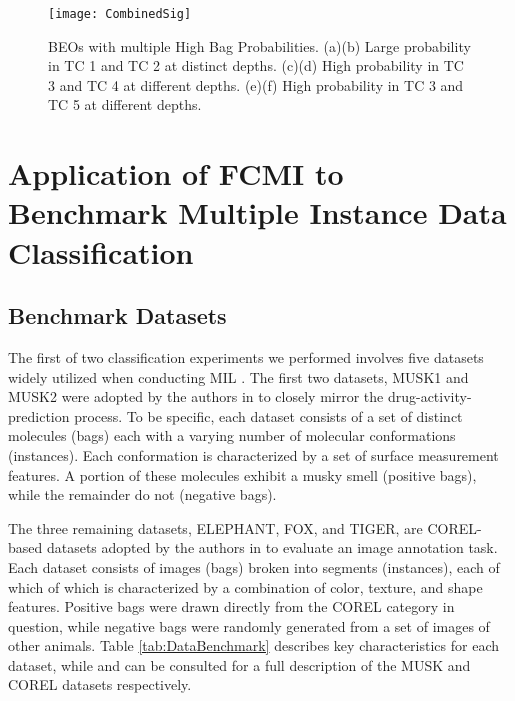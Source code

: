 \documentclass[12pt,dvips]{report}
\numberwithin{equation}{section}
\begin{document}
\begin{figure}[htb]\texttt{[image: CombinedSig]}
\caption{BEOs with multiple High Bag Probabilities.  (a)(b) Large probability in TC 1 and TC 2 at distinct depths. (c)(d) High probability in TC 3 and TC 4 at different depths.  (e)(f) High probability in TC 3 and TC 5 at different depths.}
\label{fig:CombinedSig}


\end{figure}

\clearpage

\section{Application of FCMI to Benchmark Multiple Instance Data Classification}

\subsection{Benchmark Datasets} \label{subsec:BenchmarkDatasets}
The first of two classification experiments we performed involves five datasets widely utilized when conducting MIL \cite{andrews2002support,amor13,song2015bag}.  The first two datasets, MUSK1 and MUSK2 were adopted by the authors in \cite{diet97} to closely mirror the drug-activity-prediction process.  To be specific, each dataset consists of a set of distinct molecules (bags) each with a varying number of molecular conformations (instances).  Each conformation is characterized by a set of surface measurement features.   A portion of these molecules exhibit a musky smell (positive bags), while the remainder do not (negative bags).

The three remaining datasets, ELEPHANT, FOX, and TIGER, are COREL-based datasets adopted by the authors in \cite{andrews2002support} to evaluate an image annotation task.  Each dataset consists of images (bags) broken into segments (instances), each of which of which is characterized by a combination of color, texture, and shape features.  Positive bags were drawn directly from the COREL category in question, while negative bags were randomly generated from a set of images of other animals.  Table \ref{tab:DataBenchmark} describes key characteristics for each dataset, while \cite{diet97} and \cite{andrews2002support} can be consulted for a full description of the MUSK and COREL datasets respectively.
\end{document}
